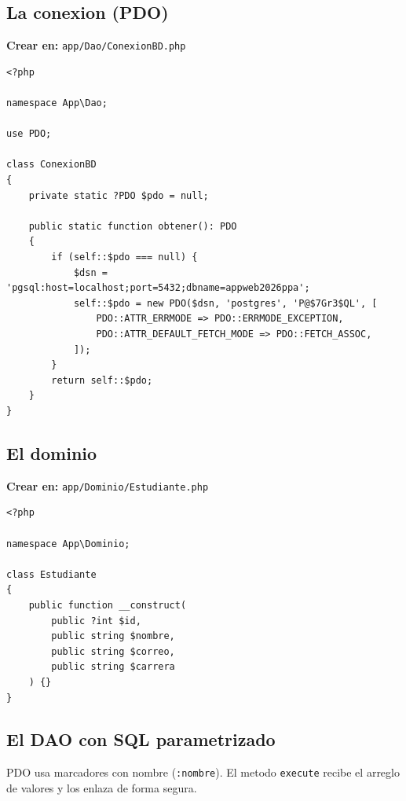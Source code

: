 \subsection{La conexion (PDO)}
\label{ap:crud:laravel:conexion}

{\small\textbf{Crear en:} \texttt{app/Dao/ConexionBD.php}}
\begin{lstlisting}[style=php,caption={ConexionBD.php (conexion PDO reutilizable)},label={lst:lv-conexion}]
<?php

namespace App\Dao;

use PDO;

class ConexionBD
{
    private static ?PDO $pdo = null;

    public static function obtener(): PDO
    {
        if (self::$pdo === null) {
            $dsn = 'pgsql:host=localhost;port=5432;dbname=appweb2026ppa';
            self::$pdo = new PDO($dsn, 'postgres', 'P@$7Gr3$QL', [
                PDO::ATTR_ERRMODE => PDO::ERRMODE_EXCEPTION,
                PDO::ATTR_DEFAULT_FETCH_MODE => PDO::FETCH_ASSOC,
            ]);
        }
        return self::$pdo;
    }
}
\end{lstlisting}

\subsection{El dominio}
\label{ap:crud:laravel:dominio}

{\small\textbf{Crear en:} \texttt{app/Dominio/Estudiante.php}}
\begin{lstlisting}[style=php,caption={Estudiante.php (dominio con propiedades promovidas)},label={lst:lv-dominio}]
<?php

namespace App\Dominio;

class Estudiante
{
    public function __construct(
        public ?int $id,
        public string $nombre,
        public string $correo,
        public string $carrera
    ) {}
}
\end{lstlisting}

\subsection{El DAO con SQL parametrizado}
\label{ap:crud:laravel:dao}

PDO usa marcadores con nombre (\texttt{:nombre}). El metodo
\texttt{execute} recibe el arreglo de valores y los enlaza de forma
segura.

